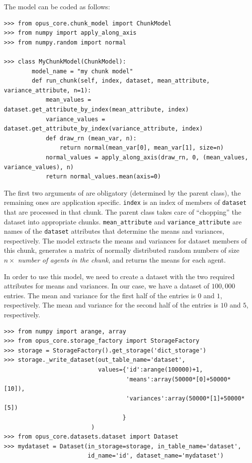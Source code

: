 The model can be coded as follows:

\numpyindex \attributesindex
\begin{verbatim}
>>> from opus_core.chunk_model import ChunkModel
>>> from numpy import apply_along_axis
>>> from numpy.random import normal

>>> class MyChunkModel(ChunkModel):
        model_name = "my chunk model"
        def run_chunk(self, index, dataset, mean_attribute, variance_attribute, n=1):
            mean_values = dataset.get_attribute_by_index(mean_attribute, index)
            variance_values = dataset.get_attribute_by_index(variance_attribute, index)
            def draw_rn (mean_var, n):
                return normal(mean_var[0], mean_var[1], size=n)
            normal_values = apply_along_axis(draw_rn, 0, (mean_values, variance_values), n)
            return normal_values.mean(axis=0)
\end{verbatim}
The first two arguments of  are obligatory (determined by the parent class),
the remaining ones are application specific. \verb|index| is an index of members of \verb|dataset|
that are processed in that chunk. The parent class takes care of ``chopping'' the dataset \datasetindex
into appropriate chunks. \verb|mean_attribute| \attributesindex and \verb|variance_attribute| \attributesindex are names of the
\verb|dataset| \datasetindex attributes that determine the means and variances, respectively. The model extracts
the means and variances for dataset members of this chunk, generates a matrix of normally distributed
random numbers of size $n \times$ {\em number of agents in the chunk}, and returns the means for each agent.


In order to use this model, we need to create a dataset \datasetindex with the two required attributes \attributesindex for means and variances.
In our case, we have a dataset \datasetindex of $100,000$ entries. The mean and variance for the first half of the entries
is $0$ and $1$, respectively. The mean and variance for the second half of the entries
is $10$ and $5$, respectively.
\numpyindex{}
\begin{verbatim}
>>> from numpy import arange, array
>>> from opus_core.storage_factory import StorageFactory
>>> storage = StorageFactory().get_storage('dict_storage')
>>> storage._write_dataset(out_table_name='dataset',
                           values={'id':arange(100000)+1,
                                   'means':array(50000*[0]+50000*[10]),
                                   'variances':array(50000*[1]+50000*[5])
                                  }
                         )
>>> from opus_core.datasets.dataset import Dataset
>>> mydataset = Dataset(in_storage=storage, in_table_name='dataset',
                        id_name='id', dataset_name='mydataset')
\end{verbatim}

